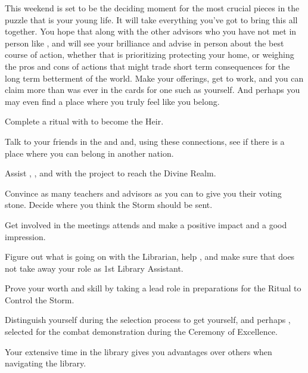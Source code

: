 \documentclass[char]{GL2020}
\begin{document}
This weekend is set to be the deciding moment for the most crucial pieces in the puzzle that is your young life. It will take everything you've got to bring this all together. You hope that \cDiplomat{} along with the other advisors who you have not met in person like \cAntiChup{}, and \cAssistantScientist{\full}will see your brilliance and advise in person about the best course of action, whether that is prioritizing protecting your home, or weighing the pros and cons of actions that might trade short term consequences for the long term betterment of the world. Make your offerings, get to work, and you can claim more than was ever in the cards for one such as yourself. And perhaps you may even find a place where you truly feel like you belong.  

\begin{itemz}
    \item Complete a ritual with \cHeir{} to become the \cHeir{\formal} Heir.
    \item Talk to your friends in the \pShip{} and \pFarm{} and, using these connections, see if there is a place where you can belong in another nation.
    \item Assist \cFlowPriest{}, \cCurse{}, and \cAssistantScientist{} with the project to reach the Divine Realm.
    \item Convince as many teachers and advisors as you can to give you their voting stone. Decide where you think the Storm should be sent. 
    \item Get involved in the meetings \cDiplomat{} attends and make a positive impact and a good impression.
    \item Figure out what is going on with the Librarian, help \cLibrarian{\them}, and make sure that \cLibAssist{} does not take away your role as 1st Library Assistant.
    \item Prove your worth and skill by taking a lead role in preparations for the Ritual to Control the Storm.
    \item Distinguish yourself during the selection process to get yourself, and perhaps \cChupStudent{}, selected for the combat demonstration during the Ceremony of Excellence.
\end{itemz}

\begin{itemz}[Notes]
    \item Your extensive time in the library gives you advantages over others when navigating the library.
\end{itemz}
\end{document}
